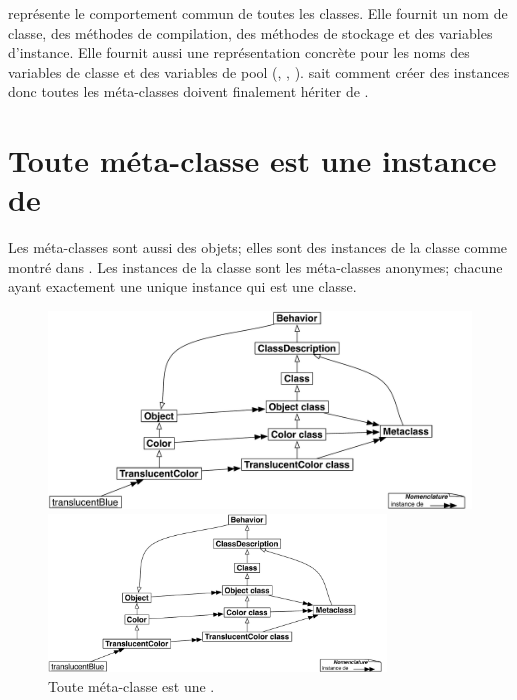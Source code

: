 \documentclass[a4paper,10pt,twoside]{book}
\begin{document}
 représente le comportement commun de toutes les classes.
Elle fournit un nom de classe, des méthodes de compilation, des méthodes de stockage et des variables d'instance.
Elle fournit aussi  une représentation concrète pour les noms des variables de classe et des variables de pool (, , ).
 sait comment créer des instances donc toutes les méta-classes doivent finalement hériter de .


\section{Toute méta-classe est une instance de }

Les méta-classes sont aussi des objets; elles sont des instances de la classe  comme montré dans .
Les instances de la classe  sont les méta-classes anonymes; chacune ayant exactement une unique instance qui est une classe.

\begin{center}
\begin{figure}
\ifluluelse
	{\centerline{\includegraphics[width=\textwidth]{TranslucentMetaclassClass}}}
	{\centerline{\includegraphics[width=0.8\textwidth]{TranslucentMetaclassClass}}}
\caption{Toute méta-classe est une .\label{fig:metaclassclass}}
\end{figure}
\end{center}
\end{document}
